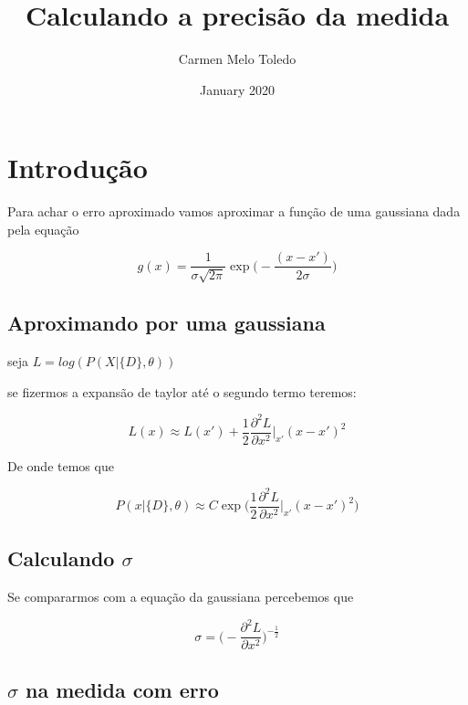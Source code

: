 \documentclass{article}
\title{Calculando a precisão da medida}
\author{Carmen Melo Toledo}
\date{January 2020}
\begin{document}
\maketitle

\section{Introdução}

Para achar o erro aproximado vamos aproximar a função de uma gaussiana dada pela equação

\begin{equation}
    g(x) = \frac{1}{\sigma\sqrt{2\pi}}\exp{\Big( - \frac{(x-x')}{2\sigma} \Big)}
\end{equation}

\subsection{Aproximando por uma gaussiana}

seja $L=log(P(X|\{D\}, \theta))$

se fizermos a expansão de taylor até o segundo termo teremos:

\begin{equation*}
    L(x) \approx L(x') + \frac{1}{2} \frac{\partial^2 L}{\partial x^2}\Big|_{x'} (x-x')^2
\end{equation*}

De onde temos que 

\begin{equation*}
P(x| \{ D \}, \theta) \approx C \exp{\Big( \frac{1}{2} \frac{\partial^2 L}{\partial x^2}\Big|_{x'} (x-x')^2  \Big)}
\end{equation*}



\subsection{Calculando $\sigma$}

Se compararmos com a equação da gaussiana percebemos que

\begin{equation}
    \sigma = \Big(- \frac{\partial^2 L}{\partial x^2} \Big)^{-\frac{1}{2}}
\end{equation}


\subsection{$\sigma$ na medida com erro}
\end{document}
